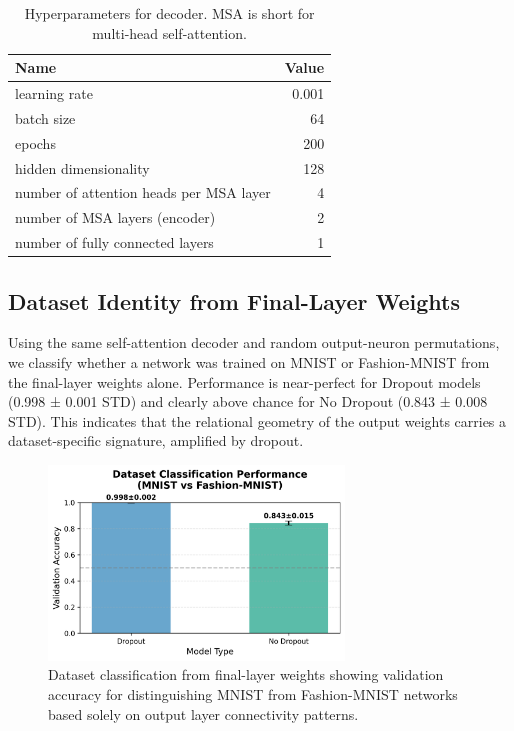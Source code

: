 \documentclass[11pt]{article}
\begin{document}
\begin{table}[htbp]
\centering
\begin{tabular}{lr}
\toprule
Name & Value \\
\midrule
learning rate & 0.001 \\
batch size & 64 \\
epochs & 200 \\
hidden dimensionality & 128 \\
number of attention heads per MSA layer & 4 \\
number of MSA layers (encoder) & 2 \\
number of fully connected layers & 1 \\
\bottomrule
\end{tabular}
\caption{Hyperparameters for decoder. MSA is short for multi-head self-attention.}
\label{tab:decoder-params}
\end{table}

\subsection{Dataset Identity from Final-Layer Weights}

Using the same self-attention decoder and random output-neuron permutations, we classify whether a network was trained on MNIST or Fashion-MNIST from the final-layer weights alone. Performance is near-perfect for Dropout models (0.998 ± 0.001 STD) and clearly above chance for No Dropout (0.843 ± 0.008 STD). This indicates that the relational geometry of the output weights carries a dataset-specific signature, amplified by dropout.

\begin{figure}[htbp]
\centering
\includegraphics[width=0.7\textwidth]{figures/dataset-classification-accuracy.png}
\caption{Dataset classification from final-layer weights showing validation accuracy for distinguishing MNIST from Fashion-MNIST networks based solely on output layer connectivity patterns.}
\label{fig:dataset-classification}
\end{figure}
\end{document}
